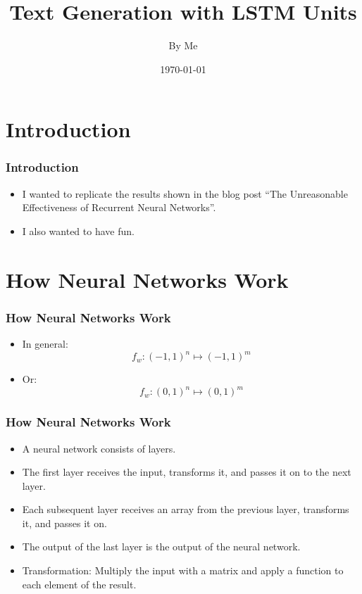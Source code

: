 \documentclass[12]{beamer}
\title{Text Generation with LSTM Units}
\author{By Me}
\date{\today}
\begin{document}
\begin{frame}
\titlepage
\end{frame}

\section{Introduction}
\begin{frame}
\frametitle{Introduction}
\begin{itemize}
\item<1-> I wanted to replicate the results shown in the blog post ``The Unreasonable Effectiveness of Recurrent Neural Networks''.
\item<2-> I also wanted to have fun.
\end{itemize}
\end{frame}


\section{How Neural Networks Work}
\begin{frame}
\frametitle{How Neural Networks Work}
\begin{itemize}
\item<1-> In general:
$$f_w:\left(-1,1\right)^n\longmapsto\left(-1,1\right)^m$$
\item<2-> Or:
$$f_w:\left(0,1\right)^n\longmapsto\left(0,1\right)^m$$
\end{itemize}
\end{frame}

\begin{frame}
\frametitle{How Neural Networks Work}
\begin{itemize}
\item<1-> A neural network consists of layers.
\item<1-> The first layer receives the input, transforms it, and passes it on to the next layer.
\item<1-> Each subsequent layer receives an array from the previous layer, transforms it, and passes it on.
\item<1-> The output of the last layer is the output of the neural network.
\item<2-> Transformation: Multiply the input with a matrix and apply a function to each element of the result.
\end{itemize}
\end{frame}
\end{document}
